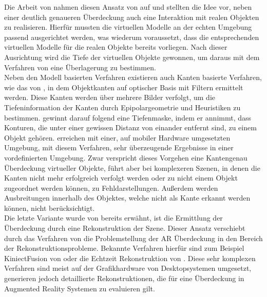 Die Arbeit von \citet{breen1996interactive} nahmen diesen Ansatz von \citet{wloka1995resolving} auf und stellten die Idee vor, neben einer deutlich genaueren Überdeckung auch eine Interaktion mit realen Objekten zu realisieren. Hierfür mussten die virtuellen Modelle an der echten Umgebung passend ausgerichtet werden, was wiederum voraussetzt, dass die entsprechenden virtuellen Modelle für die realen Objekte bereits vorliegen. Nach dieser Ausrichtung wird die Tiefe der virtuellen Objekte gewonnen, um daraus mit dem Verfahren von \citet{wloka1995resolving} eine Überlagerung zu bestimmen. \\

Neben den Modell basierten Verfahren existieren auch Kanten basierte Verfahren, wie das von \citet{berger1997resolving}, in dem Objektkanten auf optischer Basis mit Filtern ermittelt werden. Diese Kanten werden über mehrere Bilder verfolgt, um die Tiefeninformation der Kanten durch Epipolargeometrie und Heuristiken zu bestimmen. \citet{berger1997resolving} gewinnt darauf folgend  eine Tiefenmaske, indem er annimmt, dass Konturen, die unter einer gewissen Distanz von einander entfernt sind, zu einem Objekt gehören. \citet{klein2004sensor} erreichen mit einer, auf mobiler Hardware umgesetzten Umgebung, mit diesem Verfahren, sehr überzeugende Ergebnisse in einer vordefinierten Umgebung. Zwar verspricht dieses Vorgehen eine Kantengenau Überdeckung virtueller Objekte, führt aber bei komplexeren Szenen, in denen die Kanten nicht mehr erfolgreich verfolgt werden oder zu nicht einem Objekt zugeordnet werden können, zu Fehldarstellungen. Außerdem werden Ausbreitungen innerhalb des Objektes, welche nicht als Kante erkannt werden können, nicht berücksichtigt.\\

Die letzte Variante wurde von \citet{breen1996interactive} bereits erwähnt, ist die Ermittlung der Überdeckung durch eine Rekonstruktion der Szene. Dieser Ansatz verschiebt durch das Verfahren von \citet{wloka1995resolving} die Problemstellung der AR Überdeckung in den Bereich der Rekonstruktionsprobleme. Bekannte Verfahren hierfür sind zum Beispiel KiniectFusion von \citet{newcombe2011kinectfusion} oder die Echtzeit Rekonstruktion von \citep{niessner2013real}. Diese sehr komplexen Verfahren sind meist auf der Grafikhardware von Desktopsystemen umgesetzt, generieren jedoch detaillierte Rekonstruktionen, die für eine Überdeckung in Augmented Reality Systemen zu evaluieren gilt.


